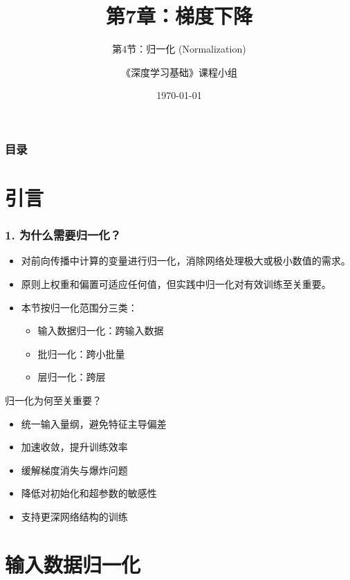 \documentclass[t,aspectratio=169]{beamer} %
\title[7.4.归一化]{第7章：梯度下降}
\subtitle{第4节：归一化 (Normalization)}
\author{《深度学习基础》课程小组}
\date{\today}
\begin{document}
\frame{\titlepage}

\begin{frame}
    \frametitle{目录}
    \tableofcontents
\end{frame}

\section{引言}

\begin{frame}
    \frametitle{1. 为什么需要归一化？}
    \begin{itemize}
        \item 对前向传播中计算的变量进行\alert{归一化}，消除网络处理极大或极小数值的需求。
        \item 原则上权重和偏置可适应任何值，但实践中\alert{归一化对有效训练至关重要}。
        \item 本节按归一化范围分三类：
        \begin{itemize}
            \item \alert{输入数据归一化}：跨输入数据
            \item \alert{批归一化}：跨小批量
            \item \alert{层归一化}：跨层
        \end{itemize}
    \end{itemize}
    \begin{block}{归一化为何至关重要？}
        \begin{itemize}
            \item 统一输入量纲，避免特征主导偏差
            \item 加速收敛，提升训练效率
            \item 缓解梯度消失与爆炸问题
            \item 降低对初始化和超参数的敏感性
            \item 支持更深网络结构的训练
        \end{itemize}
    \end{block}
\end{frame}

\section{输入数据归一化}
\end{document}
